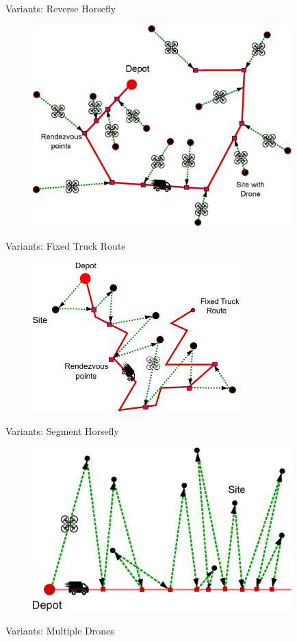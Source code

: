 \documentclass{beamer}
\begin{document}
\begin{frame}{Variants: Reverse Horsefly}
  \begin{figure}
    \centering
        \includegraphics[width=10.0cm]{slide_imgs/reverse_horsefly.eps}
  \end{figure}

\end{frame}

\begin{frame}{Variants: Fixed Truck Route}
\begin{figure}
    \centering
        \includegraphics[width=8.0cm]{slide_imgs/fixed_truck_route_variant.eps}
  \end{figure}

\end{frame}


\begin{frame}{Variants: Segment Horsefly}
\begin{figure}
    \centering
        \includegraphics[width=10.0cm]{slide_imgs/segment_horsefly.eps}
  \end{figure}

\end{frame}

\begin{frame}{Variants: Multiple Drones}
\end{frame}
\end{document}
